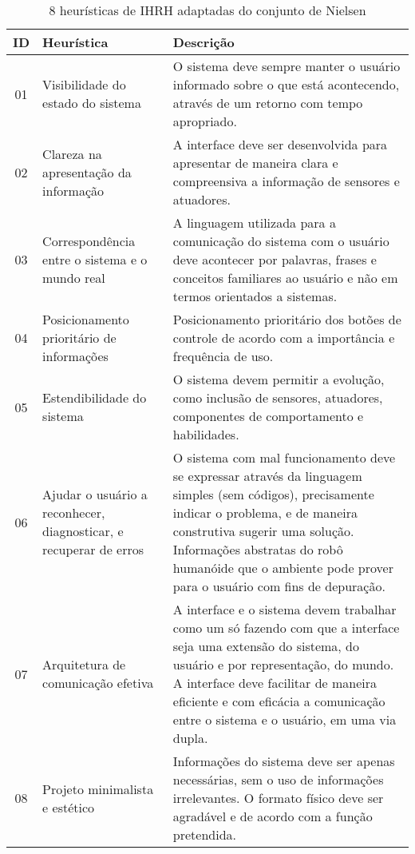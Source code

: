 \begin{table}[!ht]
	\caption{8 heurísticas de IHRH adaptadas do conjunto de Nielsen}
	\label{tab:heuristicasfutebol}
	\centering
	\begin{tabular}{ c | m{4cm} | m{10cm} }
		\hline
		ID & Heurística & Descrição \\
		\hline
        01 & Visibilidade do estado do sistema & O sistema deve sempre manter o usuário informado sobre o que está acontecendo, através de um retorno com tempo apropriado. \\
		\hline
        02 & Clareza na apresentação da informação & A interface deve ser desenvolvida para apresentar de maneira clara e compreensiva a informação de sensores e atuadores. \\
		\hline
        03 & Correspondência entre o sistema e o mundo real & A linguagem utilizada para a comunicação do sistema com o usuário deve acontecer por palavras, frases e conceitos familiares ao usuário e não em termos orientados a sistemas. \\
		\hline
        04 & Posicionamento prioritário de informações & Posicionamento prioritário dos botões de controle de acordo com a importância e frequência de uso. \\
		\hline
        05 & Estendibilidade do sistema & O sistema devem permitir a evolução, como inclusão de sensores, atuadores, componentes de comportamento e habilidades. \\
		\hline
        06 & Ajudar o usuário a reconhecer, diagnosticar, e recuperar de erros & O sistema com mal funcionamento deve se expressar através da linguagem simples (sem códigos), precisamente indicar o problema, e de maneira construtiva sugerir uma solução. Informações abstratas do robô humanóide que o ambiente pode prover para o usuário com fins de depuração. \\
		\hline
        07 & Arquitetura de comunicação efetiva & A interface e o sistema devem trabalhar como um só fazendo com que a interface seja uma extensão do sistema, do usuário e por representação, do mundo. A interface deve facilitar de maneira eficiente e com eficácia a comunicação entre o sistema e o usuário, em uma via dupla. \\
		\hline
        08 & Projeto minimalista e estético & Informações do sistema deve ser apenas necessárias, sem o uso de informações irrelevantes. O formato físico deve ser agradável e de acordo com a função pretendida. \\
		\hline
	\end{tabular}
\end{table}

